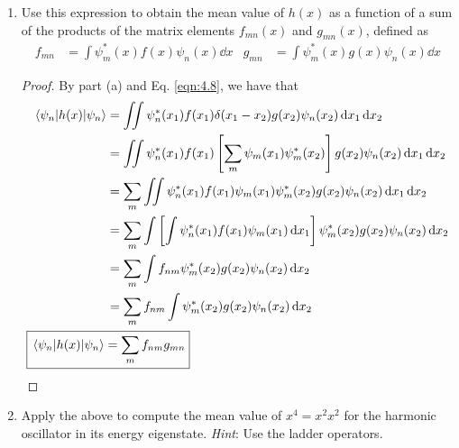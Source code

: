 \documentclass[../psets.tex]{subfiles}
\begin{document}
\begin{enumerate}
\begin{enumerate}
\begin{proof}
            \begin{align*}
                \text{RHS} &= \iint\psi_n^*(x_1)f(x_1)\delta(x_1-x_2)g(x_2)\psi_n(x_2)\dd{x_1}\dd{x_2}\\
                &= \int\left[ \int\psi_n^*(x_1)f(x_1)\delta(x_1-x_2)\dd{x_1} \right]g(x_2)\psi_n(x_2)\dd{x_2}\\
                &= \int\left[ \psi_n^*(x_2)f(x_2) \right]g(x_2)\psi_n(x_2)\dd{x_2}\\
                &= \int\psi_n^*(x)f(x)g(x)\psi_n(x)\dd{x}\\
                &= \int\psi_n^*(x)h(x)\psi_n(x)\dd{x}\\
                &= \ev{h(x)}{\psi_n}
            \end{align*}
        \end{proof}
        \item Use this expression to obtain the mean value of $h(x)$ as a function of a sum of the products of the matrix elements $f_{mn}(x)$ and $g_{mn}(x)$, defined as
        \begin{align}
            f_{mn} &= \int\psi_m^*(x)f(x)\psi_n(x)\dd{x}&
            g_{mn} &= \int\psi_m^*(x)g(x)\psi_n(x)\dd{x}
        \end{align}
        \begin{proof}
            By part (a) and Eq. \ref{eqn:4.8}, we have that
            \begin{align*}
                \ev{h(x)}{\psi_n} &= \iint\psi_n^*(x_1)f(x_1)\delta(x_1-x_2)g(x_2)\psi_n(x_2)\dd{x_1}\dd{x_2}\\
                &= \iint\psi_n^*(x_1)f(x_1)\left[ \sum_m\psi_m(x_1)\psi_m^*(x_2) \right]g(x_2)\psi_n(x_2)\dd{x_1}\dd{x_2}\\
                &= \sum_m\iint\psi_n^*(x_1)f(x_1)\psi_m(x_1)\psi_m^*(x_2)g(x_2)\psi_n(x_2)\dd{x_1}\dd{x_2}\\
                &= \sum_m\int\left[ \int\psi_n^*(x_1)f(x_1)\psi_m(x_1)\dd{x_1} \right]\psi_m^*(x_2)g(x_2)\psi_n(x_2)\dd{x_2}\\
                &= \sum_m\int f_{nm}\psi_m^*(x_2)g(x_2)\psi_n(x_2)\dd{x_2}\\
                &= \sum_mf_{nm}\int\psi_m^*(x_2)g(x_2)\psi_n(x_2)\dd{x_2}\\
                \Aboxed{\ev{h(x)}{\psi_n} &= \sum_mf_{nm}g_{mn}}
            \end{align*}
        \end{proof}
        \item Apply the above to compute the mean value of $x^4=x^2x^2$ for the harmonic oscillator in its energy eigenstate. \emph{Hint}: Use the ladder operators.

\end{enumerate}
\end{enumerate}
\end{document}
